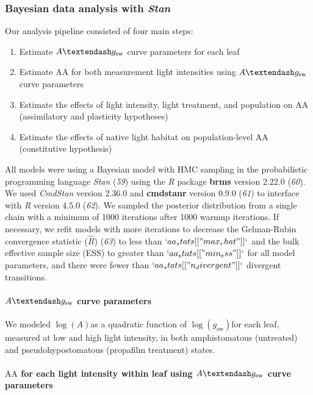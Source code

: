 \documentclass[
  letterpaper,
  DIV=11,
  numbers=noendperiod]{scrartcl}
\let\oldparagraph\paragraph
\renewcommand{\paragraph}[1]{\oldparagraph{#1}\mbox{}}
\providecommand{\tightlist}{%
  \setlength{\itemsep}{0pt}\setlength{\parskip}{0pt}}\usepackage{longtable,booktabs,array}
\newcommand{\aax}{$\mathrm{AA}$}
\newcommand{\agcurve}{$A \textendash g_\text{sw}$}
\newcommand{\loggsw}{$\log(g_\text{sw})$}
\newcommand{\logA}{$\log(A)$}
\begin{document}
\subsubsection{\texorpdfstring{Bayesian data analysis with
\emph{Stan}}{Bayesian data analysis with Stan}}\label{sec-analysis}

Our analysis pipeline consisted of four main steps:

\begin{enumerate}
\def\labelenumi{\arabic{enumi}.}
\tightlist
\item
  Estimate \agcurve{} curve parameters for each leaf
\item
  Estimate \aax{} for both measurement light intensities using
  \agcurve{} curve parameters
\item
  Estimate the effects of light intensity, light treatment, and
  population on \aax{} (assimilatory and plasticity hypotheses)
\item
  Estimate the effects of native light habitat on population-level
  \aax{} (constitutive hypothesis)
\end{enumerate}

All models were using a Bayesian model with HMC sampling in the
probabilistic programming language \emph{Stan} (\emph{59}) using the
\emph{R} package \textbf{brms} version 2.22.0 (\emph{60}). We used
\emph{CmdStan} version 2.36.0 and \textbf{cmdstanr} version 0.9.0
(\emph{61}) to interface with \emph{R} version 4.5.0 (\emph{62}). We
sampled the posterior distribution from a single chain with a minimum of
1000 iterations after 1000 warmup iterations. If necessary, we refit
models with more iterations to decrease the Gelman-Rubin convergence
statistic (\(\hat{R}\)) (\emph{63}) to less than
\(`aa_stats[["max_rhat"]]`\) and the bulk effective sample size (ESS) to
greater than \(`aa_stats[["min_ess"]]`\) for all model parameters, and
there were fewer than \(`aa_stats[["n_divergent"]]`\) divergent
transitions.

\paragraph{\texorpdfstring{\agcurve{} curve
parameters}{ curve parameters}}\label{sec-agcurve-pars}

We modeled \logA as a quadratic function of \loggsw for each leaf,
measured at low and high light intensity, in both amphistomatous
(untreated) and pseudohypostomatous (propafilm treatment) states.

\paragraph{\texorpdfstring{\aax{} for each light intensity within leaf
using \agcurve{} curve
parameters}{ for each light intensity within leaf using  curve parameters}}\label{sec-aa-est}
\end{document}
